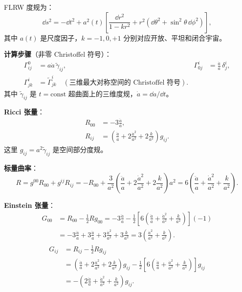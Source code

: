 \begin{example}
FLRW 度规为：
\begin{equation}
    \dd s^2 = -\dd t^2 + a^2(t) \left[ \frac{\dd r^2}{1 - k r^2} + r^2(\dd\theta^2 + \sin^2\theta\,\dd\phi^2) \right],
\end{equation}
其中 $a(t)$ 是尺度因子，$k = -1, 0, +1$ 分别对应开放、平坦和闭合宇宙。

\textbf{计算步骤}（非零 Christoffel 符号）：
\begin{align}
    \Gamma^0_{ij} &= a\dot a \, \tilde\gamma_{ij}, &
    \Gamma^i_{0j} &= \frac{\dot a}{a} \, \delta^i_j, \\
    \Gamma^i_{jk} &= \tilde\Gamma^i_{jk} \quad (\text{三维最大对称空间的 Christoffel 符号}).
\end{align}
其中 $\tilde\gamma_{ij}$ 是 $t = \text{const}$ 超曲面上的三维度规，$\dot a = \dd a/\dd t$。

\textbf{Ricci 张量}：
\begin{align}
    R_{00} &= -3\frac{\ddot a}{a}, \\
    R_{ij} &= \left( \frac{\ddot a}{a} + 2\frac{\dot a^2}{a^2} + 2\frac{k}{a^2} \right) g_{ij}.
\end{align}
这里 $g_{ij} = a^2\tilde\gamma_{ij}$ 是空间部分度规。

\textbf{标量曲率}：
\begin{equation}
    R = g^{00}R_{00} + g^{ij}R_{ij} = -R_{00} + \frac{3}{a^2}\left( \frac{\ddot a}{a} + 2\frac{\dot a^2}{a^2} + 2\frac{k}{a^2} \right) a^2
    = 6\left( \frac{\ddot a}{a} + \frac{\dot a^2}{a^2} + \frac{k}{a^2} \right).
\end{equation}

\textbf{Einstein 张量}：
\begin{align}
    G_{00} &= R_{00} - \frac{1}{2}R g_{00}
            = -3\frac{\ddot a}{a} - \frac{1}{2}\left[6\left(\frac{\ddot a}{a} + \frac{\dot a^2}{a^2} + \frac{k}{a^2}\right)\right](-1) \nonumber\\
           &= -3\frac{\ddot a}{a} + 3\frac{\ddot a}{a} + 3\frac{\dot a^2}{a^2} + 3\frac{k}{a^2}
            = 3\left( \frac{\dot a^2}{a^2} + \frac{k}{a^2} \right).
\end{align}
\begin{align}
    G_{ij} &= R_{ij} - \frac{1}{2}R g_{ij} \nonumber\\
           &= \left( \frac{\ddot a}{a} + 2\frac{\dot a^2}{a^2} + 2\frac{k}{a^2} \right) g_{ij}
              - \frac{1}{2}\left[6\left(\frac{\ddot a}{a} + \frac{\dot a^2}{a^2} + \frac{k}{a^2}\right)\right] g_{ij} \nonumber\\
           &= -\left( 2\frac{\ddot a}{a} + \frac{\dot a^2}{a^2} + \frac{k}{a^2} \right) g_{ij}.
\end{align}


\end{example}
